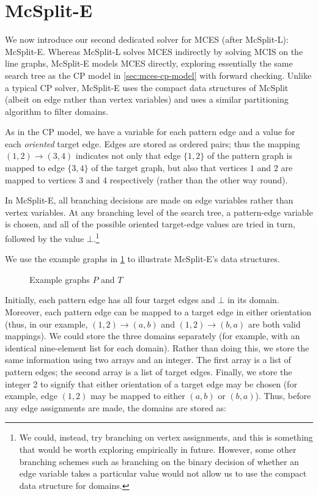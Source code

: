 \section{McSplit-E}

We now introduce our second dedicated solver for MCES (after McSplit-L): McSplit-E.  Whereas
McSplit-L solves MCES indirectly by solving MCIS on the line graphs, McSplit-E
models MCES directly, exploring essentially the same search tree as the CP
model in \cref{sec:mces-cp-model} with forward checking.  Unlike a typical CP
solver, McSplit-E uses the compact data structures of McSplit
(albeit on edge rather than vertex variables) and uses a similar partitioning
algorithm to filter domains.

As in the CP model, we have a variable for each pattern edge and a value
for each \textit{oriented} target edge.  Edges are stored as ordered pairs; thus the mapping
$(1,2) \rightarrow (3,4)$ indicates not only that edge $\{1,2\}$ of the pattern graph is
mapped to edge $\{3,4\}$ of the target graph, but also that vertices $1$ and $2$ are mapped
to vertices $3$ and $4$ respectively (rather than the other way round).

In McSplit-E, all branching decisions are made on edge variables rather than vertex variables.
At any branching level of the search tree, a pattern-edge variable is chosen, and all of the possible
oriented target-edge values are tried in turn, followed by the value
$\bot$.\footnote{We could, instead, try branching on vertex assignments, and this is
something that would be worth exploring empirically in future.  However, some other
branching schemes such as branching on the binary decision of whether an edge variable takes
a particular value would not allow us to use the compact data structure for domains.}

We use the example graphs in \cref{fig:splitp-example} to illustrate McSplit-E's data structures.
\begin{figure}[htb]
    \centering
    
    \caption{Example graphs $P$ and $T$}
    \label{fig:splitp-example}
\end{figure}

Initially, each pattern edge has all four
target edges and $\bot$ in its domain.  Moreover, each pattern edge can be mapped to a target edge in either orientation
(thus, in our example, $(1,2) \rightarrow (a,b)$ and $(1,2) \rightarrow (b,a)$ are both valid mappings). 
We could store the three domains separately (for example, with an identical nine-element list for each domain).
Rather than doing this, we store the same
information using two arrays and an integer.  The first array is a list of pattern edges;
the second array is a list of target edges. Finally, we store the integer 2 to signify that either orientation of a
target edge may be chosen (for example, edge $(1,2)$ may be mapped to either $(a,b)$ or $(b,a)$).
Thus, before any edge assignments are made, the domains are stored as:

